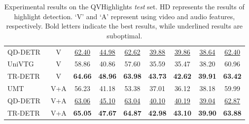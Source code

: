 \begin{table*}[!ht]
\begin{tabular}{lcccccccc}
    QD-DETR~\cite{moon2023query}        & V                    & \underline{62.40}     & \underline{44.98}     & \underline{62.62}  & \underline{39.88}  & \underline{39.86} & \underline{38.64}                 & \underline{62.40}                 \\
    UniVTG~\cite{DBLP:journals/corr/abs-2307-16715}          & V                    & 58.86      & 40.86     & 57.60   & 35.59  & 35.47 & 38.20                  & 60.96                \\
    \rowcolor[rgb]{0.78,0.78,0.78}  TR-DETR                 & V                    & \textbf{64.66}     & \textbf{48.96}     & \textbf{63.98}  & \textbf{43.73}  & \textbf{42.62} & \textbf{39.91}                 & \textbf{63.42}                \\
    \midrule
    UMT~\cite{liu2022umt}            & V+A                  & 56.23      & 41.18     & 53.38  & 37.01  & 36.12 & 38.18                 & 59.99                \\
    QD-DETR~\cite{moon2023query}                & V+A                  & \underline{63.06}      & \underline{45.10}      & \underline{63.04}  & \underline{40.10}   & \underline{40.19} & \underline{39.04}                 & \underline{62.87}                \\
    \rowcolor[rgb]{0.78,0.78,0.78} TR-DETR                 & V+A                  & \textbf{65.05}      & \textbf{47.67}     & \textbf{64.87}  & \textbf{42.98}  & \textbf{43.10}  & \textbf{39.90}                  & \textbf{63.88}                \\
    \bottomrule
    \end{tabular}
    \caption{Experimental results on the QVHighlights \emph{test} set. HD represents the results of highlight detection. `V' and `A' represent using video and audio features, respectively. Bold letters indicate the best results, while underlined results are suboptimal.}
    \label{results_QV}
\end{table*}

